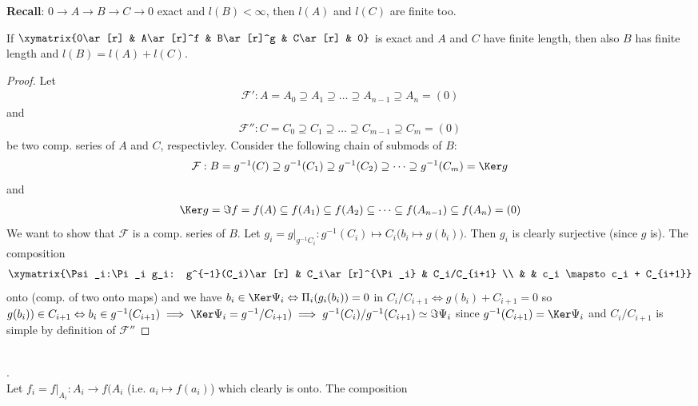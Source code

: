 \noindent\textbf{Recall}: \(0\rightarrow A \rightarrow B \rightarrow C \rightarrow 0\) exact and \(l(B) < \infty\), then \(l(A)\) and \(l(C)\) are finite too.
\begin{prop}
\label{Prop 12}
If \(\xymatrix{0\ar[r] & A\ar[r]^f & B\ar[r]^g & C\ar[r] & 0}\) is exact and \(A\) and \(C\) have finite length, then also \(B\) has finite length and \(l(B) = l(A) + l(C)\).
\end{prop}
\begin{proof}
Let 
\begin{align*}
    \mathcal{F}': A = A_0 \supseteq A_1 \supseteq\dots\supseteq A_{n-1}\supseteq A_n = (0)
\end{align*}
and
\begin{align*}
    \mathcal{F}'': C = C_0 \supseteq C_1 \supseteq\dots\supseteq C_{m-1}\supseteq C_m = (0)
\end{align*}
be two comp. series of \(A\) and \(C\), respectivley. Consider the following chain of submods of \(B\):\\[0.2cm]
\begin{align*}
    \mathcal{F}: B = g^{-1}(C) \supseteq g^{-1}(C_1) \supseteq g^{-1}(C_2) \supseteq\dots\supseteq g^{-1}(C_m) = \Ker g
\end{align*}
and
\begin{align}
    \Ker g = \Im f = f(A) \subseteq f(A_1) \subseteq f(A_2) \subseteq\dots\subseteq f(A_{n-1}) \subseteq f(A_n) = (0)
\end{align}
We want to show that \(\mathcal{F}\) is a comp. series of \(B\). Let \(g_i = g|_{g^{-1}C_i}: g^{-1}(C_i)\mapsto C_i \big(b_i\mapsto g(b_i)\big)\). Then \(g_i\) is clearly surjective (since \(g\) is). The composition
\begin{align*}
\xymatrix{\Psi_i:\Pi_i g_i: g^{-1}(C_i)\ar[r] & C_i\ar[r]^{\Pi_i} & C_i/C_{i+1}  \\
 & & c_i \mapsto c_i + C_{i+1}}
\end{align*} 
 onto (comp. of two onto maps) and we have \(b_i\in \Ker \Psi_i \Leftrightarrow \Pi_i(g_i(b_i)) = 0\) in \(C_i/C_{i+1} \Leftrightarrow g(b_i) + C_{i+1} = 0\) so \(g(b_i))\in C_{i+1} \Leftrightarrow b_i\in g^{-1}(C_{i+1})\implies \Ker\Psi_i = g^{-1}/C_{i+1})\implies g^{-1}(C_i)/g^{-1}(C_{i+1}) \simeq \Im \Psi_i\) since \(g^{-1}(C_{i+1}) = \Ker \Psi_i\) and \(C_i/C_{i+1}\) is simple by definition of \(\mathcal{F}''\)
 \end{proof}
 \\[0.5cm]
 \hline
 .\\[0.5cm]
Let \(f_i = f|_{A_i}:A_i\rightarrow f(A_i\) (i.e. \(a_i\mapsto f(a_i)\)) which clearly is onto. The composition
